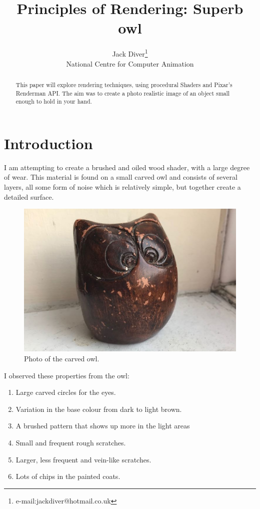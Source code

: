 \documentclass[]{acmsiggraph}
\title{Principles of Rendering: Superb owl}
\author{Jack Diver\thanks{e-mail:jackdiver@hotmail.co.uk}\\National Centre for Computer Animation}
\begin{document}
\maketitle


\begin{abstract}
This paper will explore rendering techniques, using procedural Shaders and Pixar's Renderman API. The aim was to create a photo realistic image of an object small enough to hold in your hand.
\end{abstract}

\section{Introduction} \label{sec:introduction}
I am attempting to create a brushed and oiled wood shader, with a large degree of wear. This material is found on a small carved owl and consists of several layers, all some form of noise which is relatively simple, but together create a detailed surface. 

\begin{figure}[htbp]\centering
 \includegraphics[width=0.7\linewidth]{images/real.png}
 \caption{\label{fig:reference}Photo of the carved owl.}
\end{figure}

I observed these properties from the owl:
\begin{enumerate}
 \item Large carved circles for the eyes.
 \item Variation in the base colour from dark to light brown.
 \item A brushed pattern that shows up more in the light areas
 \item Small and frequent rough scratches.
 \item Larger, less frequent and vein-like scratches.
 \item Lots of chips in the painted coats.
\end{enumerate}
\end{document}
